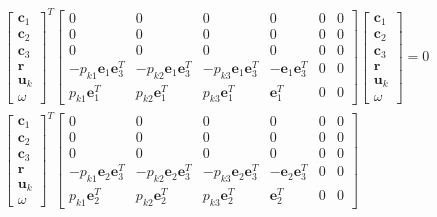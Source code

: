 \documentclass{article}
\begin{document}
\begin{align}
    \begin{bmatrix}
        \mathbf{c}_1 \\
        \mathbf{c}_2 \\
        \mathbf{c}_3 \\
        \mathbf{r} \\
        \mathbf{u}_k \\
        \omega
    \end{bmatrix}^T
    \begin{bmatrix}
        0 & 0 & 0 & 0 & 0 & 0 \\
        0 & 0 & 0 & 0 & 0 & 0 \\
        0 & 0 & 0 & 0 & 0 & 0 \\
        -p_{k1}\mathbf{e}_1\mathbf{e}_3^T & -p_{k2}\mathbf{e}_1\mathbf{e}_3^T & -p_{k3}\mathbf{e}_1\mathbf{e}_3^T & -\mathbf{e}_1\mathbf{e}_3^T & 0 & 0 \\
        p_{k1}\mathbf{e}_1^T & p_{k2}\mathbf{e}_1^T & p_{k3}\mathbf{e}_1^T & \mathbf{e}_1^T & 0 &0 
    \end{bmatrix} 
    \begin{bmatrix}
        \mathbf{c}_1 \\
        \mathbf{c}_2 \\
        \mathbf{c}_3 \\
        \mathbf{r} \\
        \mathbf{u}_k \\
        \omega
    \end{bmatrix} = 0 \\
    \begin{bmatrix}
        \mathbf{c}_1 \\
        \mathbf{c}_2 \\
        \mathbf{c}_3 \\
        \mathbf{r} \\
        \mathbf{u}_k \\
        \omega
    \end{bmatrix}^T
    \begin{bmatrix}
        0 & 0 & 0 & 0 & 0 & 0 \\
        0 & 0 & 0 & 0 & 0 & 0 \\
        0 & 0 & 0 & 0 & 0 & 0 \\
        -p_{k1}\mathbf{e}_2\mathbf{e}_3^T & -p_{k2}\mathbf{e}_2\mathbf{e}_3^T & -p_{k3}\mathbf{e}_2\mathbf{e}_3^T & -\mathbf{e}_2\mathbf{e}_3^T & 0 & 0 \\
        p_{k1}\mathbf{e}_2^T & p_{k2}\mathbf{e}_2^T & p_{k3}\mathbf{e}_2^T & \mathbf{e}_2^T & 0 &0 

\end{bmatrix}
\end{align}
\end{document}
